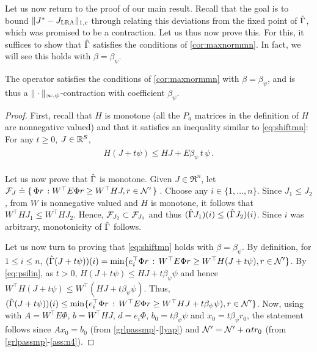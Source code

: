 Let us now return to the proof of our main result. Recall that the goal is to bound 
$\|J^*-J_{\text{\sc LRA}}\|_{1,c}$ through relating this deviations from the fixed point of $\hat{\Gamma}$, which was promised to be a contraction.
Let us thus now prove this.
For this, it suffices to show that $\hat{\Gamma}$ satisfies the conditions of \cref{cor:maxnormmn}.
In fact, we will see this holds with $\beta =\beta_\psi$. 
\begin{lemma}\label{tgmonotone}\label{gshiftmn}
The operator satisfies the conditions of \cref{cor:maxnormmn} with $\beta =\beta_\psi$, and is thus a 
$\|\cdot\|_{\infty,\psi}$-contraction with coefficient $\beta_\psi$. 
\end{lemma}
\begin{proof}
First, recall that $H$ is monotone (all 
the $P_a$ matrices in the definition of $H$ are nonnegative valued) 
and that it satisfies an inequality similar to \eqref{eq:shiftmn}: For any $t\ge 0$, $J\in \mathbb{R}^S$,
\begin{align}\label{eq:psilin}
\begin{split}
H(J+ t \psi ) \le HJ + E \beta_{\psi}\,t\,  \psi\,.
\end{split}
\end{align}

Let us now prove that $\hat{\Gamma}$ is monotone. 
Given $J\in \Re^n$, let $\mathcal{F}_J\doteq\{\,\Phi r\,: W^\top E \Phi r\geq W^\top HJ, r\in \mathcal{N}'\,\}\,$. Choose any $i\in \{1, \ldots, n\}$. Since $J_1\leq J_2$, from $W$ is nonnegative valued and $H$ is monotone, 
it follows that $W^\top H J_1\leq W^\top H J_2$. Hence, $\mathcal{F}_{J_2} \subset \mathcal{F}_{J_1}$ and thus $(\hat{\Gamma} J_1)(i) \le (\hat{\Gamma} J_2)(i)$.  Since $i$ was arbitrary, monotonicity of $\hat{\Gamma}$ follows. 

Let us now turn to proving that \eqref{eq:shiftmn} holds with $\beta =\beta_\psi$.
By definition, for $1\le i \le n$, $(\hat{\Gamma} (J+t\psi) )(i) = \min\{ e_i^\top \Phi r \,:\, W^\top E\Phi r \ge W^\top H(J+t\psi), r\in \mathcal{N}' \}$.
By \eqref{eq:psilin}, as $t>0$, $H(J+t\psi) \le HJ + t \beta_\psi \psi$ and hence $W^\top H(J+t\psi) \le W^\top (HJ + t \beta_\psi \psi)$. Thus,
$(\hat{\Gamma} (J+t\psi) )(i) \le 
 \min\{ e_i^\top \Phi r \,:\, W^\top E\Phi r \ge W^\top HJ+t\beta_\psi \psi), r\in \mathcal{N}' \}$.
Now, using  with $A=W^\top E \Phi$, $b=W^\top HJ$, $d=e_i\Phi$, $b_0=t\beta_\psi \psi$
and $x_0=t \beta_\psi r_0$, the statement follows since $A x_0 = b_0$ (from \cref{grlpassmp}-\eqref{lyap}) and $\mathcal{N}' = \mathcal{N}' + \alpha t r_0$ (from \cref{grlpassmp}-\eqref{ass:n4}).
\end{proof}
